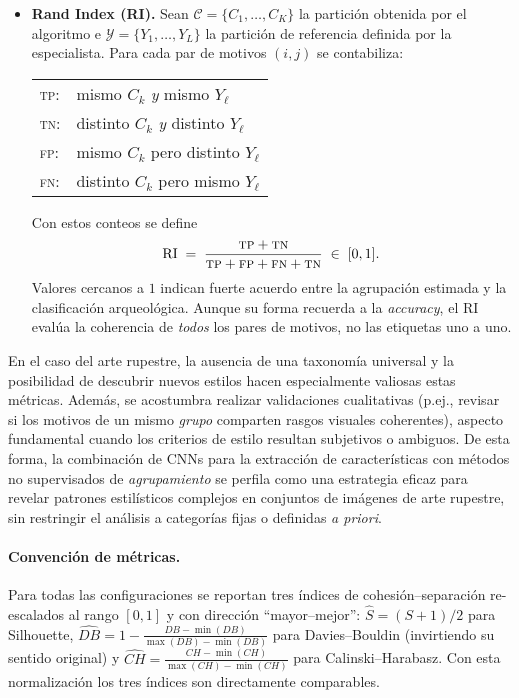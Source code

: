 \begin{itemize}
    \item \textbf{Rand Index (RI).}
    Sean \(\mathcal{C}=\{C_1,\dots,C_K\}\) la partición obtenida por el algoritmo e
    \(\mathcal{Y}=\{Y_1,\dots,Y_L\}\) la partición de referencia definida por la especialista.
    Para cada par de motivos \((i,j)\) se contabiliza:

    \begin{center}
    \begin{tabular}{ll}
    \textsc{tp}: & mismo \(C_k\) \emph{y} mismo \(Y_\ell\) \\[2pt]
    \textsc{tn}: & distinto \(C_k\) \emph{y} distinto \(Y_\ell\) \\[2pt]
    \textsc{fp}: & mismo \(C_k\) pero distinto \(Y_\ell\) \\[2pt]
    \textsc{fn}: & distinto \(C_k\) pero mismo \(Y_\ell\)
    \end{tabular}
    \end{center}

    Con estos conteos se define
    \[
      \operatorname{RI} \;=\;
      \frac{\textsc{tp} + \textsc{tn}}
           {\textsc{tp} + \textsc{fp} + \textsc{fn} + \textsc{tn}}
      \;\in\; [0,1].
    \]
    Valores cercanos a \(1\) indican fuerte acuerdo entre la agrupación estimada y la clasificación arqueológica.
    Aunque su forma recuerda a la \emph{accuracy}, el RI evalúa la coherencia de \emph{todos} los pares de motivos, no las etiquetas uno a uno.
\end{itemize}

En el caso del arte rupestre, la ausencia de una taxonomía universal y la posibilidad de descubrir nuevos estilos hacen especialmente valiosas estas métricas.
Además, se acostumbra realizar validaciones cualitativas (p.ej., revisar si los motivos de un mismo \textit{grupo} comparten rasgos visuales coherentes), aspecto fundamental cuando los criterios de estilo resultan subjetivos o ambiguos.
De esta forma, la combinación de CNNs para la extracción de características con métodos no supervisados de \textit{agrupamiento} se perfila como una estrategia eficaz para revelar patrones estilísticos complejos en conjuntos de imágenes de arte rupestre, sin restringir el análisis a categorías fijas o definidas \textit{a priori}.

\paragraph{Convención de métricas.}
Para todas las configuraciones se reportan tres índices de cohesión–separación
re-escalados al rango \([0,1]\) y con dirección “mayor–mejor”:
\(\widehat S=(S+1)/2\) para Silhouette,
\(\widehat{DB}=1-\frac{DB-\min(DB)}{\max(DB)-\min(DB)}\) para Davies–Bouldin
(invirtiendo su sentido original) y
\(\widehat{CH}=\frac{CH-\min(CH)}{\max(CH)-\min(CH)}\) para Calinski–Harabasz.
Con esta normalización los tres índices son directamente comparables.

